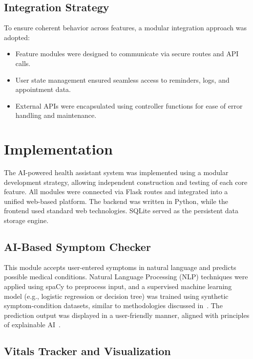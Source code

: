 \documentclass[conference]{IEEEtran}
\begin{document}
\subsection{Integration Strategy}

To ensure coherent behavior across features, a modular integration approach was adopted:
\begin{itemize}
    \item Feature modules were designed to communicate via secure routes and API calls.
    \item User state management ensured seamless access to reminders, logs, and appointment data.
    \item External APIs were encapsulated using controller functions for ease of error handling and maintenance.
\end{itemize}

\section{Implementation}

The AI-powered health assistant system was implemented using a modular development strategy, allowing independent construction and testing of each core feature. All modules were connected via Flask routes and integrated into a unified web-based platform. The backend was written in Python, while the frontend used standard web technologies. SQLite served as the persistent data storage engine.

\subsection{AI-Based Symptom Checker}

This module accepts user-entered symptoms in natural language and predicts possible medical conditions. Natural Language Processing (NLP) techniques were applied using spaCy to preprocess input, and a supervised machine learning model (e.g., logistic regression or decision tree) was trained using synthetic symptom-condition datasets, similar to methodologies discussed in~\cite{li2024healthllm}. The prediction output was displayed in a user-friendly manner, aligned with principles of explainable AI~\cite{arora2023interpretable}.

\subsection{Vitals Tracker and Visualization}
\end{document}
